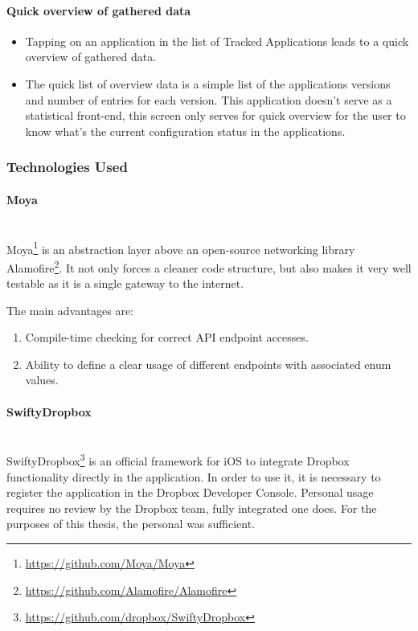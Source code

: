 \paragraph{Quick overview of gathered data}

\begin{itemize}
	\item Tapping on an application in the list of Tracked Applications leads to a quick overview of gathered data.
	\item The quick list of overview data is a simple list of the applications versions and number of entries for each version. This application doesn't serve as a statistical front-end, this screen only serves for quick overview for the user to know what's the current configuration status in the applications.
\end{itemize}

\subsubsection{Technologies Used}

\paragraph{Moya}\mbox{}\\
Moya\footnote{\url{https://github.com/Moya/Moya}} is an abstraction layer above an open-source networking library Alamofire\footnote{\url{https://github.com/Alamofire/Alamofire}}. It not only forces a cleaner code structure, but also makes it very well testable as it is a single gateway to the internet.

The main advantages are:

\begin{enumerate}
	\item Compile-time checking for correct API endpoint accesses.
	\item Ability to define a clear usage of different endpoints with associated enum values.
\end{enumerate}

\paragraph{SwiftyDropbox}\mbox{}\\
SwiftyDropbox\footnote{\url{https://github.com/dropbox/SwiftyDropbox}} is an official framework for iOS to integrate Dropbox functionality directly in the application. In order to use it, it is necessary to register the application in the Dropbox Developer Console. Personal usage requires no review by the Dropbox team, fully integrated one does. For the purposes of this thesis, the personal was sufficient.

